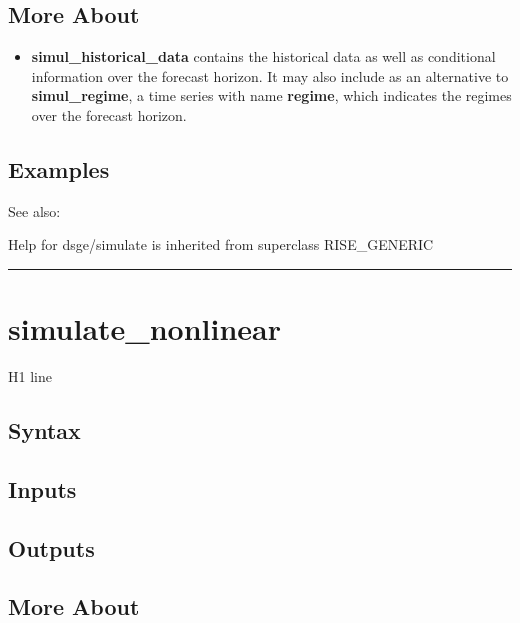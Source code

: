 \documentclass[letterpaper,10pt,english]{sphinxmanual}
\begin{document}
\subsection{More About}
\label{classes/models/@dsge/dsge:id194}\begin{itemize}
\item {} 
\textbf{simul\_historical\_data} contains the historical data as well as
conditional information over the forecast horizon. It may also include
as an alternative to \textbf{simul\_regime}, a time series with name
\textbf{regime}, which indicates the regimes over the forecast horizon.

\end{itemize}


\subsection{Examples}
\label{classes/models/@dsge/dsge:id195}
See also:

Help for dsge/simulate is inherited from superclass RISE\_GENERIC


\bigskip\hrule{}\bigskip



\section{simulate\_nonlinear}
\label{classes/models/@dsge/dsge:id196}\label{classes/models/@dsge/dsge:simulate-nonlinear}
H1 line


\subsection{Syntax}
\label{classes/models/@dsge/dsge:id197}

\subsection{Inputs}
\label{classes/models/@dsge/dsge:id198}

\subsection{Outputs}
\label{classes/models/@dsge/dsge:id199}

\subsection{More About}
\label{classes/models/@dsge/dsge:id200}
\end{document}
